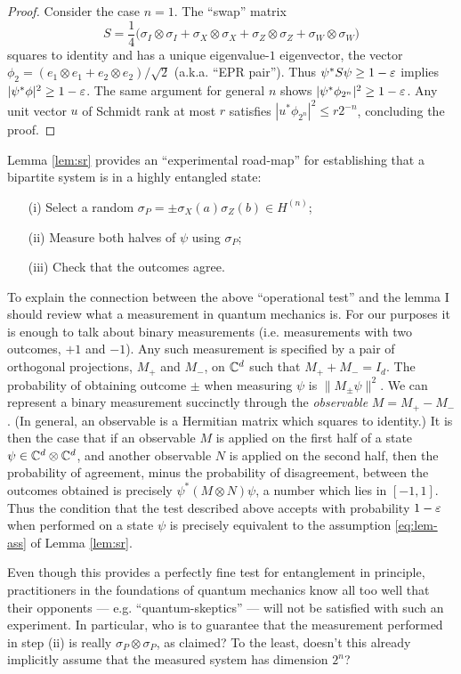\begin{proof}
Consider the case $n=1$. The ``swap'' matrix 
$$S = \frac{1}{4}\big(\sigma_I \otimes \sigma_I + \sigma_X \otimes \sigma_X + \sigma_Z \otimes \sigma_Z + \sigma_W \otimes \sigma_W\big)$$
squares to identity and has a unique eigenvalue-$1$ eigenvector, the vector $\phi_2 = (e_1\otimes e_1 + e_2\otimes e_2)/\sqrt{2}$ (a.k.a. ``EPR pair''). Thus $\psi^* S \psi \geq 1-\varepsilon$ implies $|\psi^* \phi|^2 \geq 1-\varepsilon$. The same argument for general $n$ shows $|\psi^* \phi_{2^n}|^2 \geq 1-\varepsilon$. Any unit vector $u$ of Schmidt rank at most $r$ satisfies $|u^* \phi_{2^n}|^2 \leq r2^{-n}$, concluding the proof. 
\end{proof}

Lemma \ref{lem:sr} provides an ``experimental road-map'' for establishing that a bipartite system is in a highly entangled state: 
\begin{itemize}
\item[(i)] Select a random $\sigma_P = \pm\sigma_X(a)\sigma_Z(b) \in H^{(n)}$;
\item[(ii)] Measure both halves of $\psi$ using $\sigma_P$;
\item[(iii)] Check that the outcomes agree.
\end{itemize}
To explain the connection between the above ``operational test'' and the lemma I should review what a measurement in quantum mechanics is. For our purposes it is enough to talk about binary measurements (i.e. measurements with two outcomes, $+1$ and $-1$). Any such measurement is specified by a pair of orthogonal projections, $M_+$ and $M_-$, on $\mathbb{C}^d$ such that $M_++M_- = I_d$. The probability of obtaining outcome $\pm$ when measuring $\psi$ is $\|M_\pm \psi\|^2$. We can represent a binary measurement succinctly through the \emph{observable} $M=M_+-M_-$. (In general, an observable is a Hermitian matrix which squares to identity.) It is then the case that if an observable $M$ is applied on the first half of a state $\psi\in\mathbb{C}^d\otimes\mathbb{C}^d$, and another observable $N$ is applied on the second half, then the probability of agreement, minus the probability of disagreement, between the outcomes obtained is precisely $\psi^*(M\otimes N)\psi$, a number which lies in $[-1,1]$. Thus the condition that the test described above accepts with probability $1-\varepsilon$ when performed on a state $\psi$ is precisely equivalent to the assumption \eqref{eq:lem-ass} of Lemma \ref{lem:sr}. 

Even though this provides a perfectly fine test for entanglement in principle, practitioners in the foundations of quantum mechanics know all too well that their opponents --- e.g. ``quantum-skeptics'' --- will not be satisfied with such an experiment. In particular, who is to guarantee that the measurement performed in step (ii) is really $\sigma_P\otimes\sigma_P$, as claimed? To the least, doesn't this already implicitly assume that the measured system has dimension $2^n$? 

